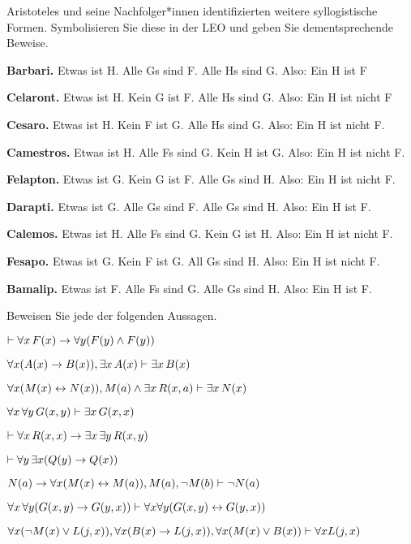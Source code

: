 \problempart
\label{pr.BarbaraEtc.proof2}
Aristoteles und seine Nachfolger*innen identifizierten weitere syllogistische Formen. Symbolisieren Sie diese in der LEO und geben Sie dementsprechende Beweise.
\begin{earg}
	\item \textbf{Barbari.} Etwas ist H. Alle Gs sind F. Alle Hs sind G. Also: Ein H ist F
	\item \textbf{Celaront.} Etwas ist H. Kein G ist F. Alle Hs sind G. Also: Ein H ist nicht F
	\item \textbf{Cesaro.} Etwas ist H. Kein F ist G. Alle Hs sind G. Also: Ein H ist nicht F.
	\item \textbf{Camestros.} Etwas ist H. Alle Fs sind G. Kein H ist G. Also: Ein H ist nicht F.
	\item \textbf{Felapton.} Etwas ist G. Kein G ist F. Alle Gs sind H. Also: Ein H ist nicht F.
	\item \textbf{Darapti.} Etwas ist G. Alle Gs sind F. Alle Gs sind H. Also: Ein H ist F.
	\item \textbf{Calemos.} Etwas ist H. Alle Fs sind G. Kein G ist H. Also: Ein H ist nicht F.
	\item \textbf{Fesapo.} Etwas ist G. Kein F ist G. All Gs sind H. Also: Ein H ist nicht F.
	\item \textbf{Bamalip.} Etwas ist F. Alle Fs sind G. Alle Gs sind H. Also: Ein H ist F.
\end{earg}

\problempart
\label{pr.someFOLproofs}
Beweisen Sie jede der folgenden Aussagen.
\begin{earg}
\item $\vdash \forall x\,\mathord{F}(x) \rightarrow \forall y(\mathord{F}(y) \wedge \mathord{F}(y))$
\item $\forall x(\mathord{A}(x)\rightarrow \mathord{B}(x)), \exists x\,\mathord{A}(x) \vdash \exists x\,\mathord{B}(x)$
\item $\forall x(\mathord{M}(x) \leftrightarrow \mathord{N}(x)), \mathord{M}(a) \wedge \exists x\,\mathord{R}(x,a) \vdash \exists x\,\mathord{N}(x)$
\item $\forall x\, \forall y\,\mathord{G}(x,y)\vdash\exists x\,\mathord{G}(x,x)$
\item $\vdash\forall x\,\mathord{R}(x,x) \rightarrow \exists x\, \exists y\,\mathord{R}(x,y)$
\item $\vdash\forall y\, \exists x (\mathord{Q}(y) \rightarrow \mathord{Q}(x))$
\item $\mathord{N}(a) \rightarrow \forall x(\mathord{M}(x) \leftrightarrow \mathord{M}(a)), \mathord{M}(a), \neg\mathord{M}(b)\vdash \neg \mathord{N}(a)$
\item $\forall x\, \forall y (\mathord{G}(x,y) \rightarrow \mathord{G}(y,x)) \vdash \forall x\forall y (\mathord{G}(x,y) \leftrightarrow \mathord{G}(y,x))$
\item $\forall x(\neg\mathord{M}(x) \vee \mathord{L}(j,x)), \forall x(\mathord{B}(x)\rightarrow \mathord{L}(j,x)), \forall x(\mathord{M}(x)\vee \mathord{B}(x))\vdash \forall x\mathord{L}(j,x)$
\end{earg}

